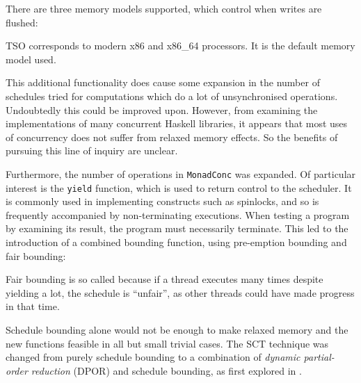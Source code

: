 There are three memory models supported, which control when writes are
flushed:




TSO corresponds to modern x86 and x86\_64 processors. It is the
default memory model used.

This additional functionality does cause some expansion in the number
of schedules tried for computations which do a lot of unsynchronised
operations. Undoubtedly this could be improved upon. However, from
examining the implementations of many concurrent Haskell libraries, it
appears that most uses of concurrency does not suffer from relaxed
memory effects. So the benefits of pursuing this line of inquiry are
unclear.

Furthermore, the number of operations in \verb|MonadConc| was
expanded. Of particular interest is the \verb|yield| function, which
is used to return control to the scheduler. It is commonly used in
implementing constructs such as spinlocks, and so is frequently
accompanied by non-terminating executions. When testing a program by
examining its result, the program must necessarily terminate. This led
to the introduction of a combined bounding function, using pre-emption
bounding and fair bounding:


Fair bounding is so called because if a thread executes many times
despite yielding a lot, the schedule is ``unfair'', as other threads
could have made progress in that time.

Schedule bounding alone would not be enough to make relaxed memory and
the new functions feasible in all but small trivial cases. The SCT
technique was changed from purely schedule bounding to a combination
of \emph{dynamic partial-order reduction} (DPOR) and schedule
bounding, as first explored in \citep{bpor}.

